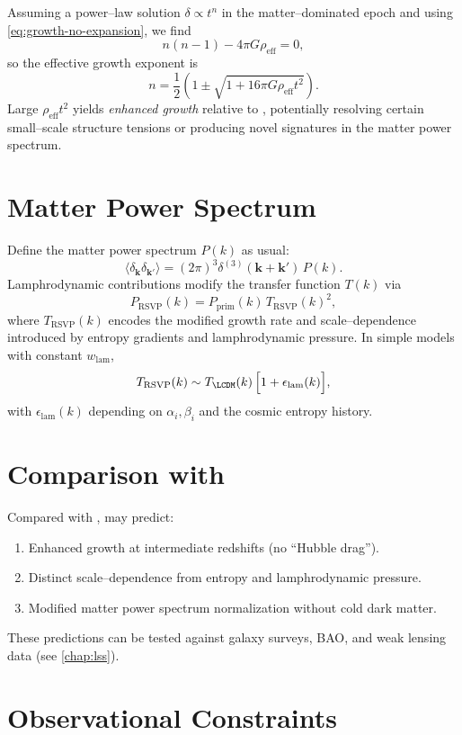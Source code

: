 Assuming a power--law solution $\delta\propto t^n$ in the matter--dominated
epoch and using \eqref{eq:growth-no-expansion}, we find
\[
  n(n-1) - 4\pi G \rho_{\mathrm{eff}} = 0,
\]
so the effective growth exponent is
\[
  n = \frac{1}{2}\left(1 \pm \sqrt{1 + 16\pi G\rho_{\mathrm{eff}}t^2}\right).
\]
Large $\rho_{\mathrm{eff}}t^2$ yields \emph{enhanced growth} relative to
\LCDM{}, potentially resolving certain small--scale structure tensions or
producing novel signatures in the matter power spectrum.

\section{Matter Power Spectrum}

Define the matter power spectrum $P(k)$ as usual:
\[
  \langle\delta_{\mathbf{k}}\delta_{\mathbf{k}'}\rangle
  = (2\pi)^3\delta^{(3)}(\mathbf{k}+\mathbf{k}')\,P(k).
\]
Lamphrodynamic contributions modify the transfer function $T(k)$ via
\[
  P_{\mathrm{RSVP}}(k)
  = P_{\mathrm{prim}}(k)\,T_{\mathrm{RSVP}}(k)^2,
\]
where $T_{\mathrm{RSVP}}(k)$ encodes the modified growth rate and
scale--dependence introduced by entropy gradients and lamphrodynamic
pressure. In simple models with constant $w_{\mathrm{lam}}$,
\[
  T_{\mathrm{RSVP}}(k)
  \sim T_{\LCDM}(k)\,\Bigl[1 + \epsilon_{\mathrm{lam}}(k)\Bigr],
\]
with $\epsilon_{\mathrm{lam}}(k)$ depending on $\alpha_i,\beta_i$ and
the cosmic entropy history.

\section{Comparison with \LCDM{}}

Compared with \LCDM{}, \rsvpabbr{} may predict:
\begin{enumerate}
\item Enhanced growth at intermediate redshifts (no ``Hubble drag'').
\item Distinct scale--dependence from entropy and lamphrodynamic pressure.
\item Modified matter power spectrum normalization without cold dark matter.
\end{enumerate}
These predictions can be tested against galaxy surveys, BAO, and weak
lensing data (see \cref{chap:lss}).

\section{Observational Constraints}

